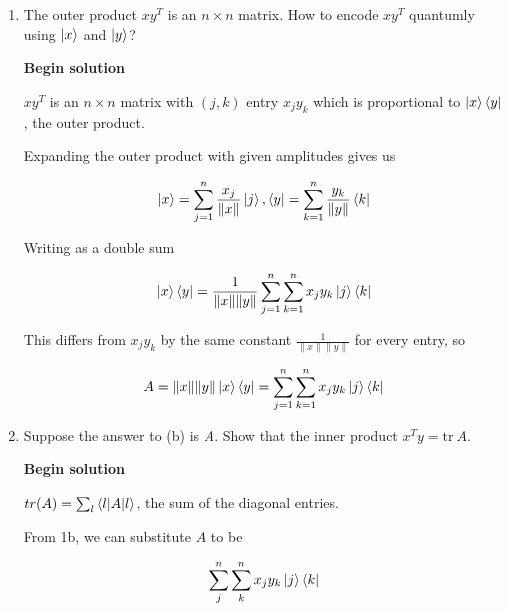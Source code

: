 \documentclass[11pt]{article}
\begin{document}
\begin{enumerate}
\begin{enumerate}
		            Thus we get

		            \begin{equation*}
			            \braket{x|y} = \frac{1}{\|x\| \|y\|} \sum_{i=1}^n x_i y_i \Rightarrow \|x\|\|y\| \braket{x|y} = \sum_i^n x_iy_i = x^Ty
		            \end{equation*}

		      \item The outer product $xy^T$ is an $n \times n$ matrix. How to encode $xy^T$ quantumly using $\ket{x}$ and $\ket{y}$?

		            \textbf{Begin solution}

		            $xy^T$ is an $n \times n$ matrix with $(j,k)$ entry $x_j y_k$ which is proportional to  $\ket{x}\bra{y}$, the outer product.

		            Expanding the outer product with given amplitudes gives us

		            \begin{equation*}
			            \ket{x} = \sum_{j=1}^n \frac{x_j}{\|x\|} \ket{j}, \bra{y} = \sum_{k=1}^n \frac{y_k}{\|y\|} \bra{k}
		            \end{equation*}

		            Writing as a double sum

		            \begin{equation*}
			            \ket{x}\bra{y} = \frac{1}{\|x\|\|y\|} \sum_{j=1}^n \sum_{k=1}^n x_j y_k \ket{j}\bra{k}
		            \end{equation*}

		            This differs from $x_j y_k$ by the same constant $\frac{1}{\|x\| \|y\|}$ for every entry, so

		            \begin{equation*}
			            A = \|x\| \|y\| \ket{x} \bra{y} = \sum_{j=1}^n \sum_{k=1}^n x_j y_k \ket{j}\bra{k}
		            \end{equation*}

		      \item Suppose the answer to (b) is \textit{A}. Show that the inner product $x^Ty = \text{tr} \ A$.

		            \textbf{Begin solution}

		            $tr(A) = \sum_l \braket{l | A | l}$, the sum of the diagonal entries.

		            From 1b, we can substitute $A$ to be

		            \begin{equation*}
			            \sum_j^n \sum_k^n x_j y_k \ket{j} \bra{k}
		            \end{equation*}


\end{enumerate}
\end{enumerate}
\end{document}
